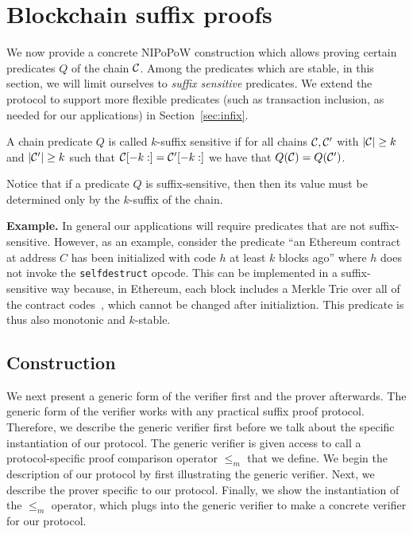 \section{Blockchain suffix proofs}
We now provide a concrete NIPoPoW construction which allows proving certain
predicates $Q$ of the chain $\mathcal{C}$. Among the predicates which are stable, in
this section, we will limit ourselves to \textit{suffix sensitive} predicates.
We extend the protocol to support more flexible predicates (such as transaction
inclusion, as needed for our applications) in Section~\ref{sec:infix}.

\begin{definition}
A chain predicate $Q$ is called $k$-\textnormal{suffix sensitive} if for all
chains $\mathcal{C}, \mathcal{C}'$ with $|\mathcal{C}| \geq k$ and $|\mathcal{C}'| \geq k$ such that
$\mathcal{C}[-k:] = \mathcal{C}'[-k:]$ we have that $Q(\mathcal{C}) = Q(\mathcal{C}')$.
\end{definition}

Notice that if a predicate $Q$ is suffix-sensitive, then then its value must be
determined only by the $k$-suffix of the chain.

\noindent\textbf{Example.}
In general our applications will require predicates that are not
suffix-sensitive. However, as an example, consider the predicate ``an Ethereum
contract at address $C$ has been initialized with code $h$ at least $k$ blocks
ago'' where $h$ does not invoke the \texttt{selfdestruct} opcode. This can be
implemented in a suffix-sensitive way because, in Ethereum, each block includes
a Merkle Trie over all of the contract codes~\cite{vitalik}, which cannot be
changed after initializtion. This predicate is thus also monotonic and
$k$-stable.

\subsection{Construction}
We next present a generic form of the verifier first and the prover afterwards.
The generic form of the verifier works with any practical suffix proof protocol.
Therefore, we describe the generic verifier first before we talk about the
specific instantiation of our protocol. The generic verifier is given access to
call a protocol-specific proof comparison operator $\leq_m$ that we define. We
begin the description of our protocol by first illustrating the generic
verifier. Next, we describe the prover specific to our protocol. Finally, we
show the instantiation of the $\leq_m$ operator, which plugs into the generic
verifier to make a concrete verifier for our protocol.

